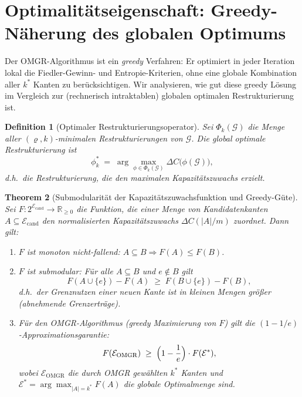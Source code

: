 \documentclass[12pt, a4paper, openany]{report}
\newtheorem{theorem}{Theorem}[chapter]
\newtheorem{definition}[theorem]{Definition}
\newcommand{\R}{\mathbb{R}}
\newcommand{\calG}{\mathcal{G}}
\newcommand{\calE}{\mathcal{E}}
\begin{document}
\section{Optimalitätseigenschaft: Greedy-Näherung des globalen Optimums}
\label{sec:algo_optimality}

Der OMGR-Algorithmus ist ein \emph{greedy} Verfahren: Er optimiert in
jeder Iteration lokal die Fiedler-Gewinn- und Entropie-Kriterien,
ohne eine globale Kombination aller $k^*$ Kanten zu berücksichtigen.
Wir analysieren, wie gut diese greedy Lösung im Vergleich zur
(rechnerisch intraktablen) globalen optimalen Restrukturierung ist.

\begin{definition}[Optimaler Restrukturierungsoperator]
\label{def:optimal_restr}
Sei $\Phi_k(\calG)$ die Menge aller $(\varrho, k)$-minimalen
Restrukturierungen von $\calG$.  Die \emph{global optimale Restrukturierung}
ist
\[
  \phi^*_k \;=\; \arg\max_{\phi \in \Phi_k(\calG)} \Delta C\!\bigl(\phi(\calG)\bigr),
\]
d.h.\ die Restrukturierung, die den maximalen Kapazitätszuwachs erzielt.
\end{definition}

\begin{theorem}[Submodularität der Kapazitätszuwachsfunktion und Greedy-Güte]
\label{thm:submodularity}
Sei $F : 2^{\calE_{\mathrm{cand}}} \to \R_{\geq 0}$ die Funktion, die
einer Menge von Kandidatenkanten $A \subseteq \calE_{\mathrm{cand}}$ den
normalisierten Kapazitätszuwachs $\Delta C(|A|/m)$ zuordnet.  Dann gilt:
\begin{enumerate}[label=(\roman*)]
  \item $F$ ist \emph{monoton nicht-fallend}:
    $A \subseteq B \Rightarrow F(A) \leq F(B)$.
  \item $F$ ist \emph{submodular}: Für alle $A \subseteq B$ und
    $e \notin B$ gilt
    \begin{equation}
      \label{eq:submodular}
      F(A \cup \{e\}) - F(A)
      \;\geq\;
      F(B \cup \{e\}) - F(B),
    \end{equation}
    d.h.\ der Grenznutzen einer neuen Kante ist in kleinen Mengen
    größer (abnehmende Grenzerträge).
  \item Für den OMGR-Algorithmus (greedy Maximierung von $F$) gilt
    die \emph{$(1-1/e)$-Approxi\-mationsgarantie}:
    \begin{equation}
      \label{eq:greedy_approx}
      F(\calE_{\mathrm{OMGR}}) \;\geq\; \Bigl(1 - \frac{1}{e}\Bigr) \cdot F(\calE^*),
    \end{equation}
    wobei $\calE_{\mathrm{OMGR}}$ die durch OMGR gewählten $k^*$ Kanten
    und $\calE^* = \arg\max_{|A|=k^*} F(A)$ die globale Optimalmenge sind.
\end{enumerate}
\end{theorem}
\end{document}
